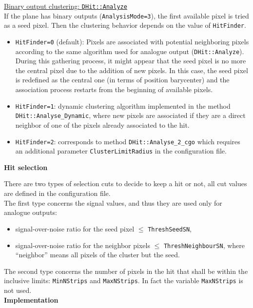 \documentclass[a4paper, 12pt, twoside]{article}
\begin{document}
\noindent
\hspace{1cm} \underline{Binary output clustering: {\tt DHit::Analyze}}\\
\noindent
If the plane has binary outputs ({\tt AnalysisMode=3}), the first available pixel is tried as a seed pixel.  Then the clustering behavior depends on the value of {\tt HitFinder}.
\begin{itemize}
\item {\tt HitFinder=0} (default): Pixels are associated with potential neighboring pixels according to the same algorithm used for analogue output ({\tt DHit::Analyze}). During this gathering process, it might appear that the seed pixel is no more the central pixel due to the addition of new pixels. In this case, the seed pixel is redefined as the central one (in terms of position barycenter) and the association process restarts from the beginning of available pixels.
\item {\tt HitFinder=1}: dynamic clustering algorithm implemented in the method {\tt DHit::Analyse\_Dynamic}, where new pixels are associated if they are a direct neighbor of one of the pixels already associated to the hit.
\item {\tt HitFinder=2}: corresponds to method {\tt DHit::Analyse\_2\_cgo} which requires an additional parameter {\tt ClusterLimitRadius} in the configuration file.
\end{itemize}



\noindent
{\bf Hit selection}

\noindent
There are two types of selection cuts to decide to keep a hit or not, all cut values are defined in the configuration file.\\
The first type concerns the signal values, and thus they are used only for analogue outputs:
\begin{itemize}
\item signal-over-noise ratio for the seed pixel $\leq$ {\tt ThreshSeedSN},
\item signal-over-noise ratio for the neighbor pixels  $\leq$ {\tt ThreshNeighbourSN}, where ``neighbor'' means all pixels of the cluster but the seed.
\end{itemize}
The second type concerns the number of pixels in the hit that shall be within the inclusive limits: {\tt MinNStrips} and {\tt MaxNStrips}. In fact the variable {\tt MaxNStrips} is not used.\\


\noindent
{\bf Implementation}
\end{document}
